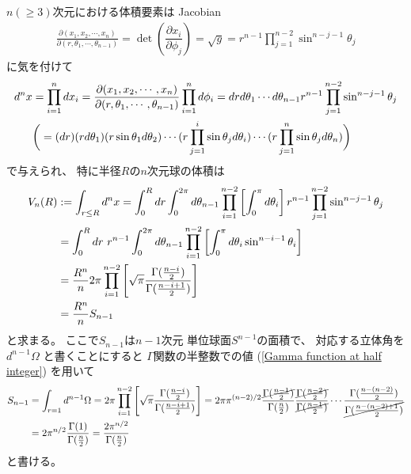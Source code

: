 $n (\ge 3)$次元における体積要素は
Jacobian
\begin{align}
    \frac{\partial(x_1, x_2, \cdots, x_n)}
    {\partial(r, \theta_1, \cdots, \theta_{n-1})}
=
    \det
\left(
    \dfrac{\partial x_i}{\partial \phi_j}
\right)
=
    \sqrt{ g }
=
    r^{n-1}
    \prod_{j = 1}^{n-2}
    \sin^{n - j - 1} \theta_j
\label{jacobian for spherical coordinates}
\end{align}
に気を付けて
\begin{align}
    d^n x
&=
    \prod_{i = 1}^n
    d x_i
=
    \frac{\partial(x_1, x_2, \cdots, x_n)}
    {\partial(r, \theta_1, \cdots, \theta_{n-1})}
    \prod_{i = 1}^n
    d \phi_i
=
    d r d \theta_1
        \cdots d \theta_{n-1}
    r^{n-1}
    \prod_{j = 1}^{n-2}
    \sin^{n - j - 1} \theta_j
\\\notag&
\bigg(
=
    (dr)
    (r d \theta_1)
    (r \sin \theta_1 d \theta_2)
\cdots
    (r \prod_{j = 1}^i
    \sin \theta_j d \theta_i)
\cdots
    (r \prod_{j = 1}^n
    \sin \theta_j d \theta_n)
\bigg)
\end{align}
で与えられ、
特に半径$R$の$n$次元球の体積は
\begin{align}
    V_n(R)
&:=
    \int_{r \le R} d^n x
=
    \int_0^R
        dr
    \int_0^{2 \pi}
        d \theta_{n-1}
    \prod_{i=1}^{n-2}
    \left[
        \int_0^{\pi}
            d \theta_i
    \right]
    r^{n-1}
    \prod_{j = 1}^{n-2}
    \sin^{n - j - 1} \theta_j
\notag\\&
=
    \int_0^R
        dr\ 
    r^{n-1}
    \int_0^{2 \pi}
        d \theta_{n-1}
    \prod_{i=1}^{n-2}
    \left[
        \int_0^{\pi}
            d \theta_i
        \sin^{n - i - 1} \theta_i
    \right]
\notag\\&
=
    \dfrac{R^n}{n}
    2 \pi
    \prod_{i=1}^{n-2}
    \left[
        \sqrt{\pi}
        \dfrac{\Gamma(\frac{n - i}{2})}
        {\Gamma(\frac{n - i + 1}{2})}
    \right]
\notag\\&
=
    \dfrac{R^n}{n}
    S_{n-1}
\end{align}
と求まる。
ここで$S_{n-1}$は$n-1$次元
単位球面$S^{n-1}$の面積で、
対応する立体角を$d^{n-1} \Omega$
と書くことにすると
$\Gamma$関数の半整数での値
(\ref{Gamma function at half integer})
を用いて
\begin{align}
    S_{n-1}
&=
    \int_{r = 1}
        d^{n-1} \Omega
=
    2 \pi
    \prod_{i=1}^{n-2}
    \left[
        \sqrt{\pi}
        \dfrac{\Gamma(\frac{n - i}{2})}
        {\Gamma(\frac{n - i + 1}{2})}
    \right]
=
    2 \pi
    \pi^{(n-2)/2}
    \dfrac{
        \cancel{
            \Gamma(\frac{n - 1}{2})
        }
    }
        {\Gamma(\frac{n}{2})}
    \dfrac{
        \cancel{
            \Gamma(\frac{n - 2}{2})
        }
    }
        {\cancel{
            \Gamma(\frac{n - 1}{2})
        }}
    \cdots
    \dfrac{\Gamma(\frac{n - (n-2)}{2})}
        {\cancel{
            \Gamma(\frac{n - (n-2) + 1}{2})
        }}
\notag\\&
=
    2
    \pi^{n/2}
    \dfrac{\Gamma(1)}
        {\Gamma(\frac{n}{2})}
=
    \dfrac{ 2 \pi^{n/2} }
        {\Gamma(\frac{n}{2})}
\label{surface area of n dimensional sphere}
\end{align}
と書ける。

